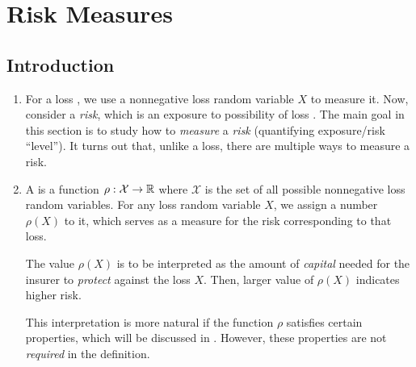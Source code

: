 \section{Risk Measures}
\label{sect:risk-measures}
\subsection{Introduction}
\begin{enumerate}
\item For a loss , we use a nonnegative loss random variable
\(X\) to measure it. Now, consider a \emph{risk}, which is an exposure to
possibility of loss . The main goal in this section is to
study how to \emph{measure} a \emph{risk} (quantifying exposure/risk
``level'').  It turns out that, unlike a loss, there are multiple ways to
measure a risk.

\item A  is a function \(\rho:\mathcal{X}\to\mathbb{R}\) where
\(\mathcal{X}\) is the set of all possible nonnegative loss random variables.
For any loss random variable \(X\), we assign a number \(\rho(X)\) to it, which
serves as a measure for the risk corresponding to that loss.

The value \(\rho(X)\) is to be interpreted as the amount of \emph{capital}
needed for the insurer  to \emph{protect} 
against the loss \(X\). Then, larger value of \(\rho(X)\) indicates higher
risk.

\begin{note}
This interpretation is more natural if the function \(\rho\) satisfies certain
properties, which will be discussed in .
However, these properties are not \emph{required} in the definition.
\end{note}
\end{enumerate}

